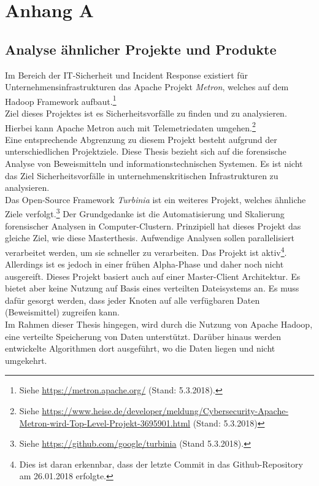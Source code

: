 \chapter{Anhang A}

\section{Analyse ähnlicher Projekte und Produkte}
Im Bereich der IT-Sicherheit und Incident Response existiert für Unternehmensinfrastrukturen das Apache Projekt \textit{Metron}, welches auf dem Hadoop Framework aufbaut.\footnote{Siehe \url{https://metron.apache.org/} (Stand: 5.3.2018).}\\ Ziel dieses Projektes ist es Sicherheitsvorfälle zu finden und zu analysieren. Hierbei kann Apache Metron auch mit Telemetriedaten umgehen.\footnote{Siehe \url{https://www.heise.de/developer/meldung/Cybersecurity-Apache-Metron-wird-Top-Level-Projekt-3695901.html} (Stand: 5.3.2018)}\\
Eine entsprechende Abgrenzung zu diesem Projekt besteht aufgrund der unterschiedlichen Projektziele. Diese Thesis bezieht sich auf die forensische Analyse von Beweismitteln und informationstechnischen Systemen. Es ist nicht das Ziel Sicherheitsvorfälle in unternehmenskritischen Infrastrukturen zu analysieren.\\

\noindent
Das Open-Source Framework \textit{Turbinia} ist ein weiteres Projekt, welches ähnliche Ziele verfolgt.\footnote{Siehe \url{https://github.com/google/turbinia} (Stand 5.3.2018).}
Der Grundgedanke ist die Automatisierung und Skalierung forensischer Analysen in Computer-Clustern. Prinzipiell hat dieses Projekt das gleiche Ziel, wie diese Masterthesis. Aufwendige Analysen sollen parallelisiert  verarbeitet werden, um sie schneller zu verarbeiten. Das Projekt ist aktiv\footnote{Dies ist daran erkennbar, dass der letzte Commit in das Github-Repository am 26.01.2018 erfolgte.}. 
Allerdings ist es jedoch in einer frühen Alpha-Phase und daher noch nicht ausgereift. Dieses Projekt basiert auch auf einer Master-Client Architektur. Es bietet aber keine Nutzung auf Basis eines verteilten Dateisystems an. Es muss dafür gesorgt werden, dass jeder Knoten auf alle verfügbaren Daten (Beweismittel) zugreifen kann.\\  
Im Rahmen dieser Thesis hingegen, wird durch die Nutzung von Apache Hadoop, eine verteilte Speicherung von Daten unterstützt. Darüber hinaus werden entwickelte Algorithmen dort ausgeführt, wo die Daten liegen und nicht umgekehrt. \\

